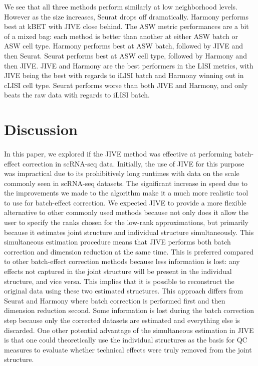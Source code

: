 \documentclass[unnumsec,webpdf,contemporary,large]{oup-authoring-template}%
\theoremstyle{thmstyleone}%
\theoremstyle{thmstyletwo}%
\theoremstyle{thmstylethree}%
\begin{document}
We see that all three methods perform similarly at low neighborhood levels. However as the size increases, Seurat drops off dramatically. Harmony performs best at kBET with JIVE close behind. The ASW metric performances are a bit of a mixed bag: each method is better than another at either ASW batch or ASW cell type. Harmony performs best at ASW batch, followed by JIVE and then Seurat. Seurat performs best at ASW cell type, followed by Harmony and then JIVE. JIVE and Harmony are the best performers in the LISI metrics, with JIVE being the best with regards to iLISI batch and Harmony winning out in cLISI cell type. Seurat performs worse than both JIVE and Harmony, and only beats the raw data with regards to iLISI batch.

\section{Discussion}

\paragraph*{}
In this paper, we explored if the JIVE method was effective at performing batch-effect correction in scRNA-seq data.
Initially, the use of JIVE for this purpose was impractical due to its prohibitively long runtimes with data on the scale commonly seen in scRNA-seq datasets. The significant increase in speed due to the improvements we made to the algorithm make it a much more realistic tool to use for batch-effect correction.
We expected JIVE to provide a more flexible alternative to other commonly used methods because not only does it allow the user to specify the ranks chosen for the low-rank approximations, but primarily because it estimates joint structure and individual structure simultaneously.
This simultaneous estimation procedure means that JIVE performs both batch correction and dimension reduction at the same time. This is preferred compared to other batch-effect correction methods because less information is lost: any effects not captured in the joint structure will be present in the individual structure, and vice versa. This implies that it is possible to reconstruct the original data using these two estimated structures. This approach differs from Seurat and Harmony where batch correction is performed first and then dimension reduction second. Some information is lost during the batch correction step because only the corrected datasets are estimated and everything else is discarded. 
One other potential advantage of the simultaneous estimation in JIVE is that one could theoretically use the individual structures as the basis for QC measures to evaluate whether technical effects were truly removed from the joint structure.
\end{document}

